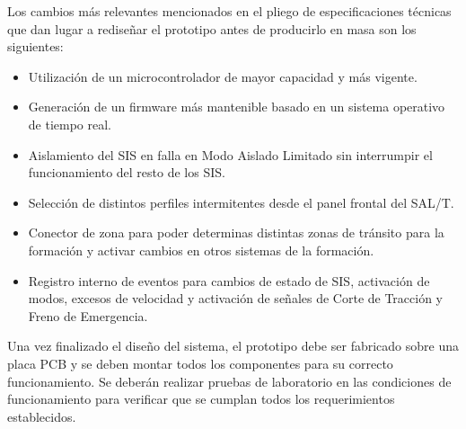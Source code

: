 Los cambios más relevantes mencionados en el pliego de especificaciones técnicas \cite{spec} que dan lugar a rediseñar el prototipo antes de producirlo en masa son los siguientes:

\begin{itemize}
    \item Utilización de un microcontrolador de mayor capacidad y más vigente.
    \item Generación de un firmware más mantenible basado en un sistema operativo de tiempo real.
    \item Aislamiento del SIS en falla en Modo Aislado Limitado sin interrumpir el funcionamiento del resto de los SIS.
    \item Selección de distintos perfiles intermitentes desde el panel frontal del SAL/T.
    \item Conector de zona para poder determinas distintas zonas de tránsito para la formación y activar cambios en otros sistemas de la formación.
    \item Registro interno de eventos para cambios de estado de SIS, activación de modos, excesos de velocidad y activación de señales de Corte de Tracción y Freno de Emergencia.
\end{itemize}


Una vez finalizado el diseño del sistema, el prototipo debe ser fabricado sobre una placa PCB y se deben montar todos los componentes para su correcto funcionamiento. Se deberán realizar pruebas de laboratorio en las condiciones de funcionamiento para verificar que se cumplan todos los requerimientos establecidos. 


